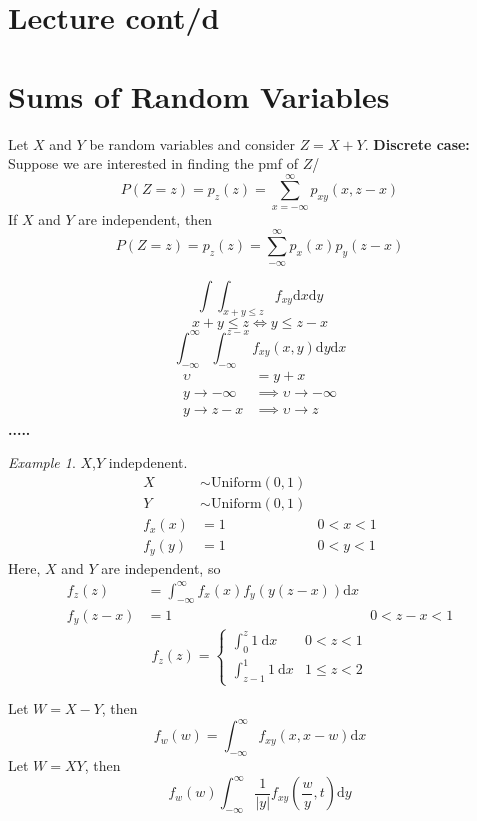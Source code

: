 \documentclass{article}
\theoremstyle{definition}
\theoremstyle{remark}
\theoremstyle{example}
\newtheorem*{example}{Example}
\renewcommand{\d}{\mathrm{d}}
\newcommand{\uni}{\mathrm{Uniform}}
\begin{document}
	\section*{Lecture cont/d}
	\section{Sums of Random Variables}
	Let $X$ and $Y$ be random variables and consider $Z=X+Y$.
	\textbf{Discrete case:} Suppose we are interested in finding the pmf of $Z$/
	\[P(Z=z)=p_z(z)=\sum_{x=-\infty}^{\infty}p_{xy}(x,z-x)\]
	If $X$ and $Y$ are independent, then \[ P(Z=z)=p_z(z)=\sum_{-\infty}^{\infty}p_x(x)p_y(z-x)\]

	\[ \int \int_{x+y\leq z} f_{xy} \d x \d y \]
	\[x+y \leq z \iff y \leq z-x \]
	\[\int_{-\infty}^{\infty} \int_{-\infty}^{z-x} f_{xy}(x,y) \d y \d x \]
	\begin{align*}
		\upsilon &= y+x\\
		y \to - \infty &\implies \upsilon \to - \infty\\
		y \to z-x & \implies \upsilon \to z
	\end{align*}
	\textbf{.....}
	\begin{example}
		$X$,$Y$ indepdenent.
		\begin{align*}
			X & \sim \uni(0,1)\\
			Y & \sim \uni(0,1)\\
			f_x(x)&=1 & 0< x < 1\\
			f_y(y)&=1 & 0 < y < 1
		\end{align*}
		Here, $X$ and $Y$ are independent, so \begin{align*}
			f_z(z)&=\int_{-\infty}^{\infty}f_x(x)f_y(y(z-x)) \d x\\
			f_y(z-x)&=1&0 < z -x < 1
		\end{align*}\[ f_z(z)=
		\begin{cases}
			\int_{0}^{z}1 \ \d x & 0 < z < 1\\
			\int_{z-1}^{1} 1 \ \d x & 1 \leq z < 2
		\end{cases}\]
	\end{example}

	Let $W=X-Y$, then \[f_w(w)=\int_{-\infty}^{\infty}f_{xy}(x,x-w) \d x\]
	Let $W=XY$, then \[f_w(w)\int_{-\infty}^{\infty}\frac{1}{|y|}f_{xy}\left(\frac{w}{y},t\right) \d y \]
	
\end{document}
